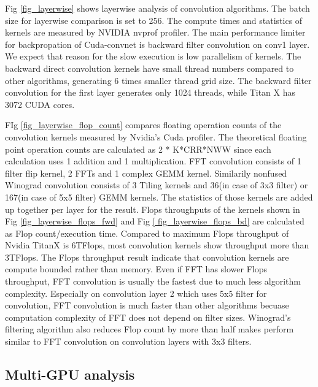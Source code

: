 Fig \ref{fig_layerwise} shows layerwise analysis of convolution algorithms.
The batch size for layerwise comparison is set to 256.
The compute times and statistics of kernels are measured by NVIDIA nvprof profiler.
The main performance limiter for backpropation of Cuda-convnet is backward filter convolution on conv1 layer.
We expect that reason for the slow execution is low parallelism of kernels.
The backward direct convolution kernels have small thread numbers compared to other algorithms, generating 6 times smaller thread grid size.
The backward filter convolution for the first layer generates only 1024 threads, while Titan X has 3072 CUDA cores.

FIg \ref{fig_layerwise_flop_count} compares floating operation counts of the convolution kernels measured by Nvidia's Cuda profiler.
The theoretical floating point operation counts are calculated as 2 * K*CRR*NWW since each calculation uses 1 addition and 1 multiplication.
FFT convolution consists of 1 filter flip kernel, 2 FFTs and 1 complex GEMM kernel.
Similarily nonfused Winograd convolution consists of 3 Tiling kernels and 36(in case of 3x3 filter) or 167(in case of 5x5 filter) GEMM kernels.
The statistics of those kernels are added up together per layer for the result.
Flops throughputs of the kernels shown in Fig \ref{fig_layerwise_flops_fwd} and Fig \ref{ fig_layerwise_flops_bd} are calculated as Flop count/execution time.
Compared to maximum Flops throughput of Nvidia TitanX is 6TFlops, most convolution kernels show throughput more than 3TFlops.
The Flops throughput result indicate that convolution kernels are compute bounded rather than memory.
Even if FFT has slower Flops throughput, FFT convolution is usually the fastest due to much less algorithm complexity.
Especially on convolution layer 2 which uses 5x5 filter for convolution, FFT convolution is much faster than other algorithms becuase computation complexity of FFT does not depend on filter sizes.
Winograd's filtering algorithm also reduces Flop count by more than half makes perform similar to FFT convolution on convolution layers with 3x3 filters.

\subsection{Multi-GPU analysis}

